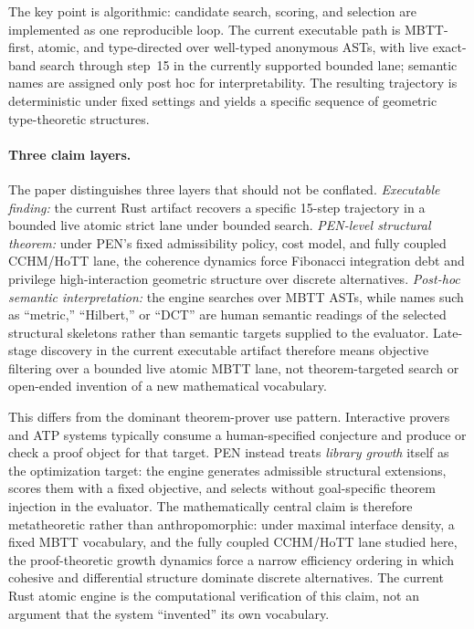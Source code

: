 \documentclass[11pt,a4paper]{article}
\theoremstyle{plain}
\theoremstyle{definition}
\theoremstyle{remark}
\begin{document}
The key point is algorithmic: candidate search, scoring, and selection are implemented as one reproducible loop.
The current executable path is MBTT-first, atomic, and type-directed over well-typed anonymous ASTs, with live exact-band search through step~15 in the currently supported bounded lane; semantic names are assigned only post hoc for interpretability.
The resulting trajectory is deterministic under fixed settings and yields a specific sequence of geometric type-theoretic structures.

\paragraph{Three claim layers.}
The paper distinguishes three layers that should not be conflated.
\emph{Executable finding:} the current Rust artifact recovers a specific 15-step trajectory in a bounded live atomic strict lane under bounded search.
\emph{PEN-level structural theorem:} under PEN's fixed admissibility policy, cost model, and fully coupled CCHM/HoTT lane, the coherence dynamics force Fibonacci integration debt and privilege high-interaction geometric structure over discrete alternatives.
\emph{Post-hoc semantic interpretation:} the engine searches over MBTT ASTs, while names such as ``metric,'' ``Hilbert,'' or ``DCT'' are human semantic readings of the selected structural skeletons rather than semantic targets supplied to the evaluator.
Late-stage discovery in the current executable artifact therefore means objective filtering over a bounded live atomic MBTT lane, not theorem-targeted search or open-ended invention of a new mathematical vocabulary.

This differs from the dominant theorem-prover use pattern.
Interactive provers and ATP systems typically consume a human-specified conjecture and produce or check a proof object for that target.
PEN instead treats \emph{library growth} itself as the optimization target: the engine generates admissible structural extensions, scores them with a fixed objective, and selects without goal-specific theorem injection in the evaluator.
The mathematically central claim is therefore metatheoretic rather than anthropomorphic: under maximal interface density, a fixed MBTT vocabulary, and the fully coupled CCHM/HoTT lane studied here, the proof-theoretic growth dynamics force a narrow efficiency ordering in which cohesive and differential structure dominate discrete alternatives.
The current Rust atomic engine is the computational verification of this claim, not an argument that the system ``invented'' its own vocabulary.
\end{document}
